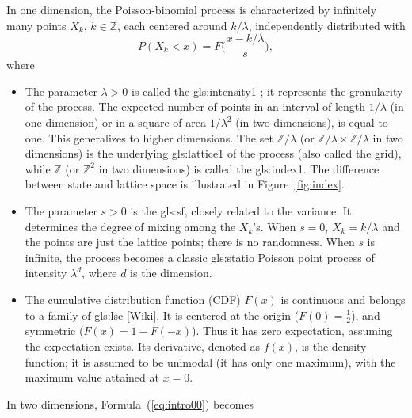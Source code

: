 \documentclass[10pt]{article}
\begin{document}
In one dimension, the \textcolor{index}{Poisson-binomial process} is characterized by infinitely many points $X_k$, $k\in\mathbb{Z}$, each centered around $k/\lambda$, independently distributed with  
\begin{equation}
P(X_k<x)=F\Big(\frac{x-k/\lambda}{s}\Big),\label{eq:intro00}
\end{equation}
where 
\begin{itemize}
\item The parameter $\lambda>0$  is called the 
\gls{gls:intensity1}%
; 
it represents the granularity of the process. The expected number of points in an interval of length $1/\lambda$ (in one dimension) or in a square of area $1/\lambda^2$ (in two dimensions), 
is equal to one. This generalizes to higher dimensions. 
The set $\mathbb{Z}/\lambda$ (or $\mathbb{Z}/\lambda \times \mathbb{Z}/\lambda$ in two dimensions)
 is the underlying 
\gls{gls:lattice1} %
 of the process (also called the \textcolor{index}{grid}), while $\mathbb{Z}$ (or $\mathbb{Z}^2$ in two dimensions) is called the \gls{gls:index1}. The difference between state and lattice space is illustrated in Figure~\ref{fig:index}.
\item The parameter $s >0$ is the 
\gls{gls:sf}, 
closely related to the variance. It determines the degree of mixing among the $X_k$'s. When $s=0$, $X_k=k/\lambda$ and the points are just the lattice points; there is no randomness. When $s$ is infinite, the process becomes a classic \gls{gls:statio} Poisson point process of intensity $\lambda^d$, where $d$ is the dimension.
\item The cumulative distribution function (CDF) $F(x)$ is continuous and belongs to a family of 
\gls{gls:lsc} %
[\href{https://en.wikipedia.org/wiki/Location-scale_family}{Wiki}]. It is centered at the origin ($F(0)=\frac{1}{2}$), and symmetric ($F(x)=1-F(-x)$). Thus it has zero expectation, assuming the expectation exists. Its derivative, denoted as $f(x)$, is the density function; it is assumed to be unimodal (it has only one maximum), with the maximum value attained at $x=0$.
\end{itemize}
\noindent In two dimensions, Formula~(\ref{eq:intro00}) becomes
\end{document}
